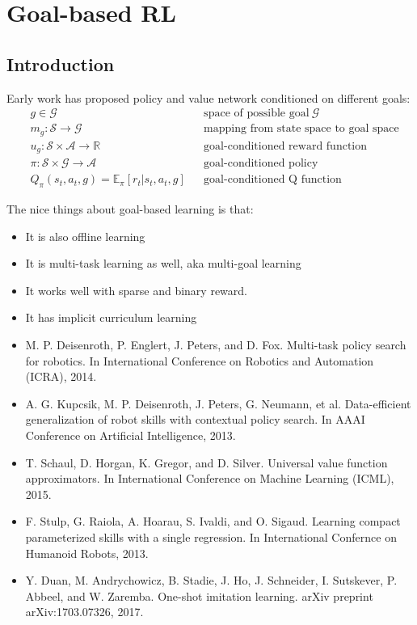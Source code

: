 \chapter{Goal-based RL}

\section{Introduction}
Early work has proposed policy and value network conditioned on different goals: \cite{schaul2015universal}
\begin{align}
	&g \in \mathcal{G} && \text{space of possible goal}\ \mathcal{G}\\
	&m_g: \mathcal{S} \rightarrow \mathcal{G} && \text{mapping from state space to goal space}\\
	&u_{g}: \mathcal{S} \times \mathcal{A} \rightarrow \mathbb{R} && \text{goal-conditioned reward function}\\
	&\pi: \mathcal{S} \times \mathcal{G} \rightarrow \mathcal{A} && \text{goal-conditioned policy}\\
	&Q_{\pi}(s_t, a_t, g) = \mathbb{E}_{\pi}[r_t | s_t, a_t, g] && \text{goal-conditioned Q function}
\end{align}

The nice things about goal-based learning is that:
\begin{itemize}
	\item It is also offline learning
	\item It is multi-task learning as well, \ac{aka} multi-goal learning
	\item It works well with sparse and binary reward.
	\item It has implicit curriculum learning
\end{itemize}

\begin{itemize}
	\item M. P. Deisenroth, P. Englert, J. Peters, and D. Fox. Multi-task policy search for robotics. In International Conference on Robotics and Automation (ICRA), 2014.
	\item A. G. Kupcsik, M. P. Deisenroth, J. Peters, G. Neumann, et al. Data-efficient generalization of robot skills with contextual policy search. In AAAI Conference on Artificial Intelligence, 2013.
	\item T. Schaul, D. Horgan, K. Gregor, and D. Silver. Universal value function approximators. In International Conference on Machine Learning (ICML), 2015.
	\item F. Stulp, G. Raiola, A. Hoarau, S. Ivaldi, and O. Sigaud. Learning compact parameterized skills with a single regression. In International Confernce on Humanoid Robots, 2013.
	\item Y. Duan, M. Andrychowicz, B. Stadie, J. Ho, J. Schneider, I. Sutskever, P. Abbeel, and W. Zaremba. One-shot imitation learning. arXiv preprint arXiv:1703.07326, 2017.
\end{itemize}

